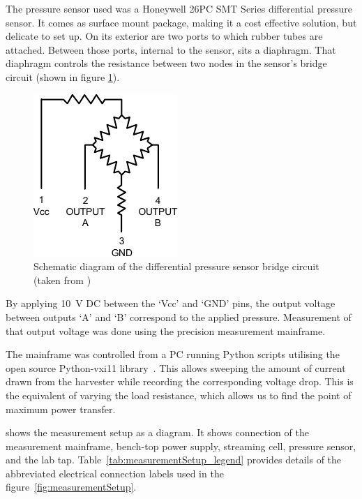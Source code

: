     The pressure sensor used was a Honeywell 26PC SMT Series differential pressure sensor.
    It comes as surface mount package, making it a cost effective solution, but delicate to set up.
    On its exterior are two ports to which rubber tubes are attached.
    Between those ports, internal to the sensor, sits a diaphragm.
    That diaphragm controls the resistance between two nodes in the sensor's bridge circuit (shown in figure \ref{fig:PressureSensorSchematic}).
    \begin{figure}
        \centering
        \includegraphics{content/pt1/01-PowerHarvesting/graphics/PressureSensorSchematic}
        \caption{\label{fig:PressureSensorSchematic}Schematic diagram of the differential pressure sensor bridge circuit (taken from \cite{Honeywell2003})}
    \end{figure}
    By applying \SI{10}{\volt} DC between the `Vcc' and `GND' pins, the output voltage between outputs `A' and `B' correspond to the applied pressure.
    Measurement of that output voltage was done using the precision measurement mainframe.

    The mainframe was controlled from a PC running Python scripts utilising the open source Python-vxi11 library~\cite{Python-ivi2014}.
    This allows sweeping the amount of current drawn from the harvester while recording the corresponding voltage drop.
    This is the equivalent of varying the load resistance, which allows us to find the point of maximum power transfer.

     shows the measurement setup as a diagram.
    It shows connection of the measurement mainframe, bench-top power supply, streaming cell, pressure sensor, and the lab tap.
    Table~\ref{tab:measurementSetup_legend} provides details of the abbreviated electrical connection labels used in the figure~\ref{fig:measurementSetup}.

